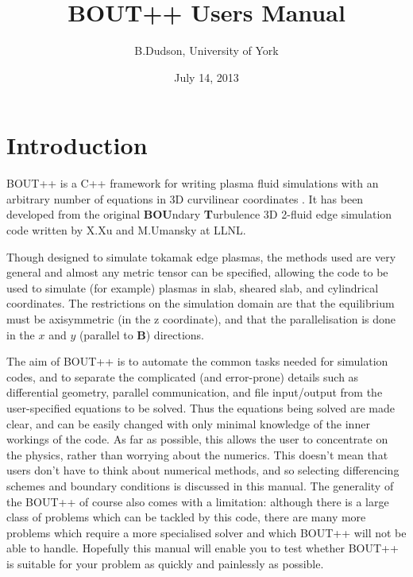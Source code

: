 \documentclass[12pt]{article}
\begin{document}
\title{BOUT++ Users Manual}
\author{B.Dudson, University of York}
\date{July 14, 2013}
\maketitle

\tableofcontents

\section{Introduction}

BOUT++ is a C++ framework for writing plasma fluid simulations with an arbitrary number of equations
in 3D curvilinear coordinates \cite{Dudson2009,dudson-2008-arxiv}. It has been developed from the original {\bf BOU}ndary {\bf T}urbulence
3D 2-fluid edge simulation code \cite{bout_manual,umansky-2008-bout,xu-2008} written by X.Xu and M.Umansky at LLNL.

Though designed to simulate tokamak edge plasmas, the methods used are very general and almost
any metric tensor can be specified, allowing the code to be used to simulate (for example) plasmas in 
slab, sheared slab, and cylindrical coordinates. The restrictions on the simulation domain
are that the equilibrium must be axisymmetric (in the z coordinate), and that the parallelisation
is done in the $x$ and $y$ (parallel to $\mathbf{B}$) directions.

The aim of BOUT++ is to automate the common tasks needed for simulation codes, and to separate the
complicated (and error-prone) details such as differential geometry, parallel communication, and
file input/output from the user-specified equations to be solved. Thus the equations being solved
are made clear, and can be easily changed with only minimal knowledge of the inner workings of the
code. As far as possible, this allows the user to concentrate on the physics, rather than worrying
about the numerics. This doesn't mean that users don't have to think about numerical methods, and so selecting differencing schemes and boundary conditions is discussed in this manual. The generality of the BOUT++ of course also comes with a limitation: although there is a large class of problems which can be tackled by this code, there are many more problems which require a more specialised solver and which BOUT++ will not be able to handle. Hopefully this manual will enable you to test whether BOUT++ is suitable for your problem as quickly and painlessly as possible.
\end{document}
